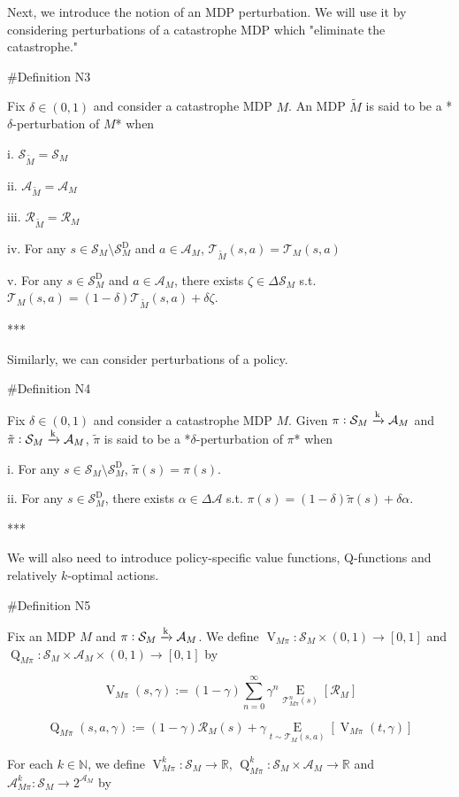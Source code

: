 \documentclass[a4paper]{article}
\newcommand{\AP}[1]{\left(#1\right)}
\newcommand{\AB}[1]{\left[#1\right]}
\newcommand{\Ea}[2]{\underset{#1}{\operatorname{E}}\AB{#2}}
\newcommand{\Nats}{\mathbb{N}}
\newcommand{\Reals}{\mathbb{R}}
\newcommand{\M}{\xrightarrow{\textnormal{k}}}
\newcommand{\A}{\mathcal{A}}
\newcommand{\St}{\mathcal{S}}
\newcommand{\T}{\mathcal{T}}
\newcommand{\R}{\mathcal{R}}
\newcommand{\RMD}{\mathrm{D}}
\newcommand{\SD}{\St^{\RMD}}
\newcommand{\V}{\operatorname{V}}
\newcommand{\Q}{\operatorname{Q}}
\begin{document}
Next, we introduce the notion of an MDP perturbation. We will use it by considering perturbations of a catastrophe MDP which "eliminate the catastrophe."

\#Definition N3

Fix $\delta\in(0,1)$ and consider a catastrophe MDP $M$. An MDP $\tilde{M}$ is said to be a *$\delta$-perturbation of $M$* when

i. $\St_{\tilde{M}} = \St_M$

ii. $\A_{\tilde{M}} = \A_M$

iii. $\R_{\tilde{M}}=\R_M$

iv. For any $s \in \St_M \setminus \SD_M$ and $a \in \A_M$, $\T_{\tilde{M}}\AP{s,a}=\T_{M}\AP{s,a}$

v. For any $s \in \SD_M$ and $a \in \A_M$, there exists $\zeta \in \Delta\St_M$ s.t. $\T_{M}\AP{s,a}=(1-\delta)\T_{\tilde{M}}\AP{s,a}+\delta\zeta$.

***

Similarly, we can consider perturbations of a policy.

\#Definition N4

Fix $\delta\in(0,1)$ and consider a catastrophe MDP $M$. Given $\pi: \St_M \M \A_M$ and $\tilde{\pi}: \St_M \M \A_M$, $\tilde{\pi}$ is said to be a *$\delta$-perturbation of $\pi$* when

i. For any $s \in \St_M \setminus \SD_M$, $\tilde{\pi}(s) = \pi(s)$.

ii. For any $s \in \SD_M$, there exists $\alpha\in\Delta\A$ s.t. $\pi(s)=(1-\delta)\tilde{\pi}(s)+\delta\alpha$.

***

We will also need to introduce policy-specific value functions, Q-functions and relatively $k$-optimal actions.

\#Definition N5

Fix an MDP $M$ and $\pi: \St_M \M \A_M$. We define $\V_{M\pi}: \St_M \times (0,1) \rightarrow [0,1]$ and $\Q_{M\pi}: \St_M \times \A_M \times (0,1) \rightarrow [0,1]$ by

$$\V_{M\pi}(s,\gamma) := (1-\gamma) \sum_{n=0}^\infty \gamma^n \Ea{\T_{M\pi}^n(s)}{\R_M}$$

$$\Q_{M\pi}(s,a,\gamma) := (1-\gamma) \R_M(s) + \gamma \Ea{t \sim \T_{M}(s,a)}{\V_{M\pi}(t,\gamma)}$$

For each $k \in \Nats$, we define $\V_{M\pi}^k: \St_M \rightarrow \Reals$, $\Q_{M\pi}^k: \St_M \times \A_M \rightarrow \Reals$ and $\A_{M\pi}^k: \St_M \rightarrow 2^{\A_M}$ by
\end{document}
